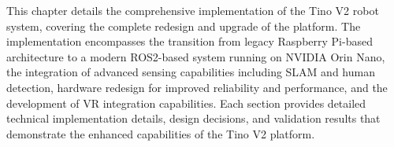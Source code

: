 This chapter details the comprehensive implementation of the Tino V2 robot system, covering the complete redesign and upgrade of the platform. The implementation encompasses the transition from legacy Raspberry Pi-based architecture to a modern ROS2-based system running on NVIDIA Orin Nano, the integration of advanced sensing capabilities including SLAM and human detection, hardware redesign for improved reliability and performance, and the development of VR integration capabilities. Each section provides detailed technical implementation details, design decisions, and validation results that demonstrate the enhanced capabilities of the Tino V2 platform.


